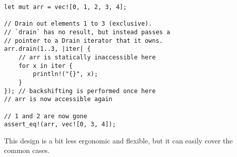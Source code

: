 \begin{verbatim}
let mut arr = vec![0, 1, 2, 3, 4];

// Drain out elements 1 to 3 (exclusive).
// `drain` has no result, but instead passes a
// pointer to a Drain iterator that it owns.
arr.drain(1..3, |iter| {
    // arr is statically inaccessible here
    for x in iter {
        println!("{}", x);
    }
}); // backshifting is performed once here
// arr is now accessible again

// 1 and 2 are now gone
assert_eq!(arr, vec![0, 3, 4]);
\end{verbatim}

This design is a bit less ergonomic and flexible, but it can easily cover the
common cases.

